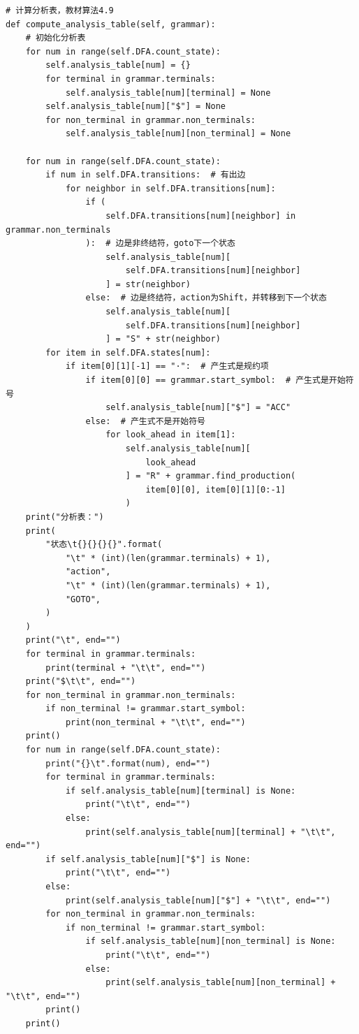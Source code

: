 \documentclass[lang=cn,11pt,a4paper]{elegantpaper}
\begin{document}
\begin{lstlisting}
# 计算分析表，教材算法4.9
def compute_analysis_table(self, grammar):
    # 初始化分析表
    for num in range(self.DFA.count_state):
        self.analysis_table[num] = {}
        for terminal in grammar.terminals:
            self.analysis_table[num][terminal] = None
        self.analysis_table[num]["$"] = None
        for non_terminal in grammar.non_terminals:
            self.analysis_table[num][non_terminal] = None

    for num in range(self.DFA.count_state):
        if num in self.DFA.transitions:  # 有出边
            for neighbor in self.DFA.transitions[num]:
                if (
                    self.DFA.transitions[num][neighbor] in grammar.non_terminals
                ):  # 边是非终结符，goto下一个状态
                    self.analysis_table[num][
                        self.DFA.transitions[num][neighbor]
                    ] = str(neighbor)
                else:  # 边是终结符，action为Shift，并转移到下一个状态
                    self.analysis_table[num][
                        self.DFA.transitions[num][neighbor]
                    ] = "S" + str(neighbor)
        for item in self.DFA.states[num]:
            if item[0][1][-1] == "·":  # 产生式是规约项
                if item[0][0] == grammar.start_symbol:  # 产生式是开始符号
                    self.analysis_table[num]["$"] = "ACC"
                else:  # 产生式不是开始符号
                    for look_ahead in item[1]:
                        self.analysis_table[num][
                            look_ahead
                        ] = "R" + grammar.find_production(
                            item[0][0], item[0][1][0:-1]
                        )
    print("分析表：")
    print(
        "状态\t{}{}{}{}".format(
            "\t" * (int)(len(grammar.terminals) + 1),
            "action",
            "\t" * (int)(len(grammar.terminals) + 1),
            "GOTO",
        )
    )
    print("\t", end="")
    for terminal in grammar.terminals:
        print(terminal + "\t\t", end="")
    print("$\t\t", end="")
    for non_terminal in grammar.non_terminals:
        if non_terminal != grammar.start_symbol:
            print(non_terminal + "\t\t", end="")
    print()
    for num in range(self.DFA.count_state):
        print("{}\t".format(num), end="")
        for terminal in grammar.terminals:
            if self.analysis_table[num][terminal] is None:
                print("\t\t", end="")
            else:
                print(self.analysis_table[num][terminal] + "\t\t", end="")
        if self.analysis_table[num]["$"] is None:
            print("\t\t", end="")
        else:
            print(self.analysis_table[num]["$"] + "\t\t", end="")
        for non_terminal in grammar.non_terminals:
            if non_terminal != grammar.start_symbol:
                if self.analysis_table[num][non_terminal] is None:
                    print("\t\t", end="")
                else:
                    print(self.analysis_table[num][non_terminal] + "\t\t", end="")
        print()
    print()

\end{lstlisting}
\end{document}
